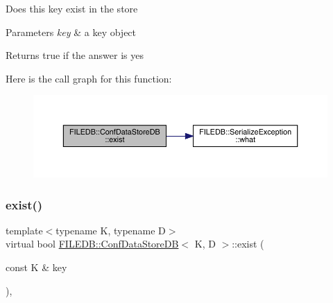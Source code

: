 Does this key exist in the store 
\begin{DoxyParams}{Parameters}
{\em key} & a key object \\
\hline
\end{DoxyParams}
\begin{DoxyReturn}{Returns}
true if the answer is yes 
\end{DoxyReturn}
Here is the call graph for this function\+:
\nopagebreak
\begin{figure}[H]
\begin{center}
\leavevmode
\includegraphics[width=350pt]{d8/d19/classFILEDB_1_1ConfDataStoreDB_afedf2b2ec0b10469cebb72397b02459d_cgraph}
\end{center}
\end{figure}
\mbox{\label{classFILEDB_1_1ConfDataStoreDB_afedf2b2ec0b10469cebb72397b02459d}} 
\subsubsection{\texorpdfstring{exist()}{exist()}\hspace{0.1cm}{\footnotesize\ttfamily [3/3]}}
{\footnotesize\ttfamily template$<$typename K, typename D$>$ \\
virtual bool \mbox{\hyperlink{classFILEDB_1_1ConfDataStoreDB}{F\+I\+L\+E\+D\+B\+::\+Conf\+Data\+Store\+DB}}$<$ K, D $>$\+::exist (\begin{DoxyParamCaption}\item[{const K \&}]{key }\end{DoxyParamCaption})\hspace{0.3cm}{\ttfamily [inline]}, {\ttfamily [virtual]}}


